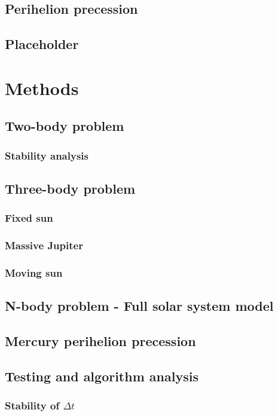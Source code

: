 \documentclass[10pt]{article}
\begin{document}
\begin{multicols}{2}
\subsection{Perihelion precession}
\subsection{Placeholder}

\section{Methods}

\subsection{Two-body problem} 
\subsubsection{Stability analysis}
\subsection{Three-body problem} 
\subsubsection{Fixed sun}
\subsubsection{Massive Jupiter}
\subsubsection{Moving sun}
\subsection{N-body problem - Full solar system model} 
\subsection{Mercury perihelion precession}
\subsection{Testing and algorithm analysis}
\subsubsection{Stability of $\Delta t$}

\end{multicols}
\end{document}
